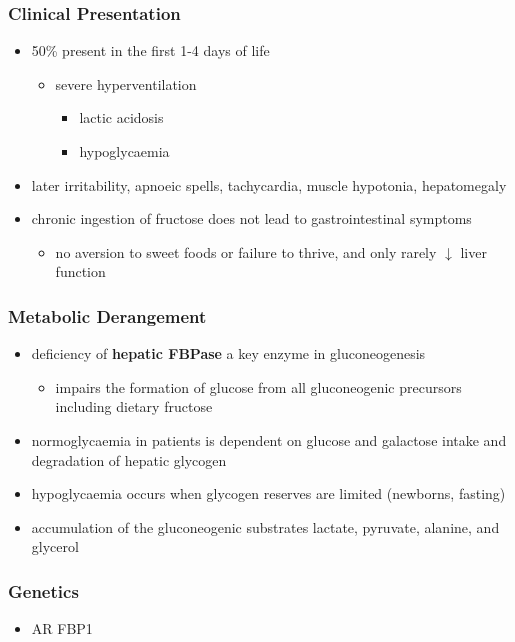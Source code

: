 \documentclass[12pt]{scrartcl}
\begin{document}
\subsubsection{Clinical Presentation}
\label{sec:org4e10170}
\begin{itemize}
\item 50\% present in the first 1-4 days of life
\begin{itemize}
\item severe hyperventilation
\begin{itemize}
\item lactic acidosis
\item hypoglycaemia
\end{itemize}
\end{itemize}
\item later irritability, apnoeic spells, tachycardia, muscle hypotonia, hepatomegaly
\item chronic ingestion of fructose does not lead to gastrointestinal symptoms
\begin{itemize}
\item no aversion to sweet foods or failure to thrive, and only rarely \(\downarrow\) liver function
\end{itemize}
\end{itemize}

\subsubsection{Metabolic Derangement}
\label{sec:org7124334}
\begin{itemize}
\item deficiency of \textbf{hepatic FBPase} a key enzyme in gluconeogenesis
\begin{itemize}
\item impairs the formation of glucose from all gluconeogenic precursors including dietary fructose
\end{itemize}
\item normoglycaemia in patients is dependent on glucose and galactose
intake and degradation of hepatic glycogen
\item hypoglycaemia occurs when glycogen reserves are limited (newborns, fasting)
\item accumulation of the gluconeogenic substrates lactate, pyruvate, alanine, and glycerol
\end{itemize}
\subsubsection{Genetics}
\label{sec:org42a7baf}
\begin{itemize}
\item AR FBP1
\end{itemize}
\end{document}
